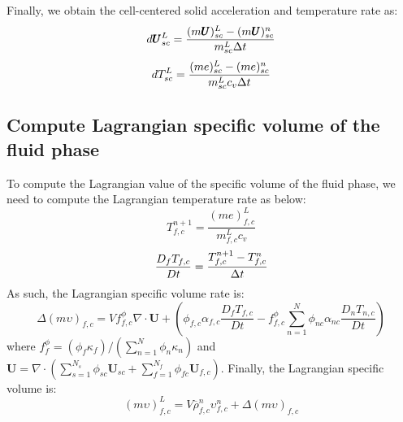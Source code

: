 \documentclass[preprint,12pt]{elsarticle}
\begin{document}
%
%
Finally, we obtain the cell-centered solid  acceleration and temperature rate as:
%
%
\begin{equation}
 d\pmb{U}_{sc}^L = \frac{(m \pmb{U})_{sc}^L - (m \pmb{U})_{sc}^n}{m_{sc}^L \Delta{t}}
\end {equation}
%
\begin{equation}
 dT_{sc}^L = \frac{(me)_{sc}^L - (me)_{sc}^n}{m_{sc}^L c_v \Delta{t}}
\end {equation}
%
%
\subsection{\textsf{Compute Lagrangian specific volume of the fluid phase}}
To compute the Lagrangian value of the specific volume of the fluid phase, we need to compute the Lagrangian temperature rate as below:
%
%
\begin{equation}
 T_{f,c}^{n+1} = \frac{(me)_{f,c}^L}{m_{f,c}^L c_v}
\end {equation}
%
%
\begin{equation}
 \frac{D_f T_{f,c}}{Dt} =  \frac{T_{f,c}^{n+1} - T_{f,c}^{n}}{\Delta{t}}
\end {equation}
%
%
As such, the Lagrangian specific volume rate is:
%
%
\begin{equation}
 \Delta (m \upsilon)_{f,c} = V f_{f,c}^{\phi} \nabla \cdot \pmb{U} + (\phi_{f,c} \alpha_{f,c} \frac{D_f T_{f,c}}{Dt} - f_{f,c}^{\phi} \sum_{n=1}^{N} \phi_{nc} \alpha_{nc} \frac{D_n T_{n,c}}{Dt})
\end {equation}
%
%
where $ f_f^{\phi} = (\phi_f  \kappa_f ) / (\sum_{n=1}^{N} \phi_n \kappa_n)$ and  $\pmb{U} = \nabla \cdot (\sum_{s=1}^{N_s} \phi_{sc} \pmb{U}_{sc} + \sum_{f=1}^{N_f}  \phi_{fc} \pmb{U}_{f,c})$.
%
%
Finally, the Lagrangian specific volume is:
\begin{equation}
 (m \upsilon)_{f,c}^L = V \overline{\rho}_{f,c}^n \upsilon_{f,c}^n + \Delta (m\upsilon)_{f,c} 
\end {equation}
%
%
\end{document}
